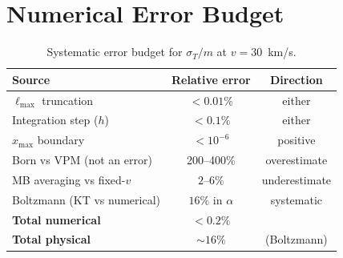 \documentclass[12pt,a4paper]{article}
\newcommand{\sigmaT}{\sigma_T}
\begin{document}
\section{Numerical Error Budget}
\label{app:error_budget}

\begin{table}[h!]
\centering
\caption{Systematic error budget for $\sigmaT/m$ at $v = 30$~km/s.}
\label{tab:error_budget}
\begin{tabular}{lcc}
\toprule
Source & Relative error & Direction \\
\midrule
$\ell_{\max}$ truncation   & $< 0.01\%$  & either \\
Integration step ($h$)     & $< 0.1\%$   & either \\
$x_{\max}$ boundary        & $< 10^{-6}$ & positive \\
Born vs VPM (not an error) & 200--400\%  & overestimate \\
MB averaging vs fixed-$v$  & $2$--$6\%$  & underestimate \\
Boltzmann (KT vs numerical)& $16\%$ in $\alpha$ & systematic \\
\midrule
\textbf{Total numerical}   & $< 0.2\%$   & \\
\textbf{Total physical}    & $\sim 16\%$ & (Boltzmann) \\
\bottomrule
\end{tabular}
\end{table}



\end{document}
